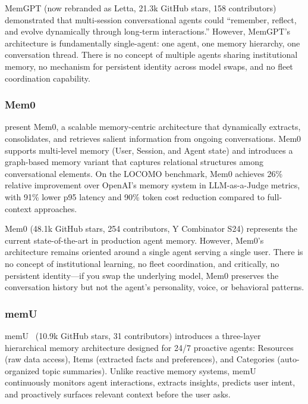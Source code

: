 \documentclass[11pt,a4paper]{article}
\begin{document}
MemGPT (now rebranded as Letta, 21.3k GitHub stars, 158 contributors) demonstrated that multi-session conversational agents could ``remember, reflect, and evolve dynamically through long-term interactions.'' However, MemGPT's architecture is fundamentally single-agent: one agent, one memory hierarchy, one conversation thread. There is no concept of multiple agents sharing institutional memory, no mechanism for persistent identity across model swaps, and no fleet coordination capability.


\subsubsection{Mem0}

\citet{chhikara2025mem0} present Mem0, a scalable memory-centric architecture that dynamically extracts, consolidates, and retrieves salient information from ongoing conversations. Mem0 supports multi-level memory (User, Session, and Agent state) and introduces a graph-based memory variant that captures relational structures among conversational elements. On the LOCOMO benchmark, Mem0 achieves 26\% relative improvement over OpenAI's memory system in LLM-as-a-Judge metrics, with 91\% lower p95 latency and 90\% token cost reduction compared to full-context approaches.

Mem0 (48.1k GitHub stars, 254 contributors, Y Combinator S24) represents the current state-of-the-art in production agent memory. However, Mem0's architecture remains oriented around a single agent serving a single user. There is no concept of institutional learning, no fleet coordination, and critically, no persistent identity---if you swap the underlying model, Mem0 preserves the conversation history but not the agent's personality, voice, or behavioral patterns.


\subsubsection{memU}

memU~\citep{memu2025} (10.9k GitHub stars, 31 contributors) introduces a three-layer hierarchical memory architecture designed for 24/7 proactive agents: Resources (raw data access), Items (extracted facts and preferences), and Categories (auto-organized topic summaries). Unlike reactive memory systems, memU continuously monitors agent interactions, extracts insights, predicts user intent, and proactively surfaces relevant context before the user asks.
\end{document}
